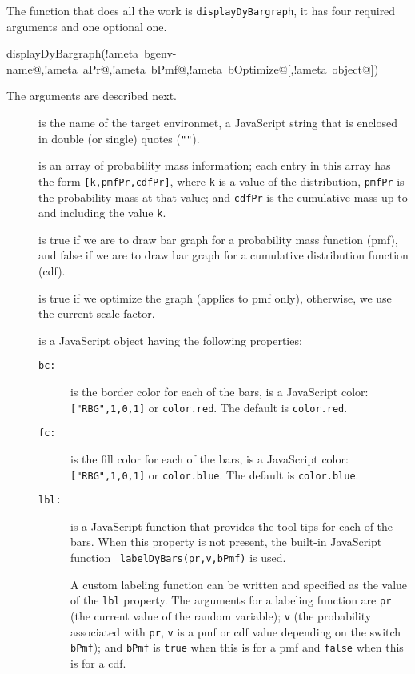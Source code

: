 \documentclass{article}
\let\uif\textsf
\begin{document}
The function that does all the work is \texttt{displayDyBargraph}, it has
four required arguments and one optional one.
\bVerb{}%
\begin{dCmd}[commandchars={!~@}]{\bxSize}
displayDyBargraph(!ameta~bgenv-name@,!ameta~aPr@,!ameta~bPmf@,!ameta~bOptimize@[,!ameta~object@])
\end{dCmd}
\eVerb
The arguments are described next.
\begin{description}
 \item[] is the name of the target environmet, a JavaScript
     string that is enclosed in double (or single) quotes
     (\texttt{""}).
 \item[] is an array of probability mass information; each entry
     in this array has the form \texttt{[k,pmfPr,cdfPr]},  where \texttt{k}
     is a value of the distribution, \texttt{pmfPr} is the probability mass
     at that value; and \texttt{cdfPr} is the cumulative mass up to and
     including the value \texttt{k}.
 \item[] is true if we are to draw bar graph for a probability
     mass function (\uif{pmf}), and false if we are to draw bar graph for a cumulative
     distribution function (\uif{cdf}).
 \item[] is true if we optimize the graph (applies to \uif{pmf}
     only), otherwise, we use the current scale factor.
 \item[] is a JavaScript object having the following properties:
 \begin{description}
      \item[\texttt{bc:}] is the border color for each of the bars,
       is a JavaScript color: \texttt{["RBG",1,0,1]} or \texttt{color.red}.
      The default is \texttt{color.red}.
      \item[\texttt{fc:}] is the fill color for each of the bars,
       is a JavaScript color: \texttt{["RBG",1,0,1]} or \texttt{color.blue}.
      The default is \texttt{color.blue}.
      \item[\texttt{lbl:}] is a JavaScript function that provides the tool tips
      for each of the bars. When this property is not present, the built-in JavaScript
      function \texttt{\_labelDyBars(pr,v,bPmf)} is used.

    A custom labeling function can be written and specified as the value of
    the \texttt{lbl} property. The arguments for a labeling function are
    \texttt{pr} (the current value of the random variable); \texttt{v} (the
    probability associated with \texttt{pr}, \texttt{v} is a \uif{pmf} or
    \uif{cdf} value depending on the switch \texttt{bPmf}); and \texttt{bPmf}
    is \texttt{true} when this is for a \textsf{pmf} and \texttt{false} when
    this is for a \textsf{cdf}.
 \end{description}
\end{description}
\end{document}
